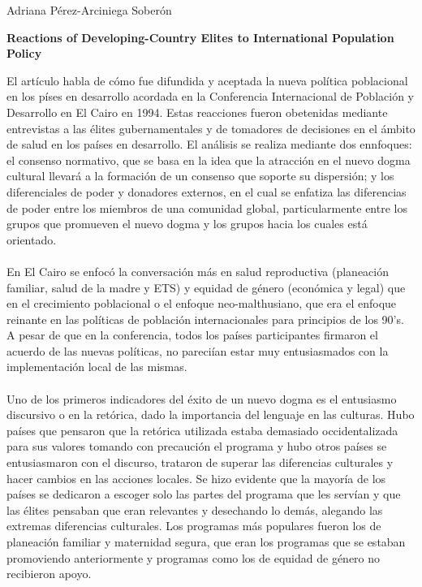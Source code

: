 \documentclass[10pt,spanish,letterpaper]{article}
\theoremstyle{plain}
\begin{document}
\begin{flushleft}
Adriana P\'erez-Arciniega Sober\'on
\end{flushleft}
\begin{center}
\textbf{Reactions of Developing-Country Elites to International Population Policy}
\end{center}
El art\'iculo \cite{luke2002reactions} habla de c\'omo fue difundida y aceptada la nueva pol\'itica poblacional en los p\'ises en desarrollo acordada en la Conferencia Internacional de Poblaci\'on y Desarrollo en El Cairo en 1994. Estas reacciones fueron obetenidas mediante entrevistas a las \'elites gubernamentales y de tomadores de decisiones en el \'ambito de salud en los pa\'ises en desarrollo. El an\'alisis se realiza mediante dos ennfoques: el consenso normativo, que se basa en la idea que la atracci\'on en el nuevo dogma cultural llevar\'a a la formaci\'on de un consenso que soporte su dispersi\'on; y los diferenciales de poder y donadores externos, en el cual se enfatiza las diferencias de poder entre los miembros de una comunidad global, particularmente entre los grupos que promueven el nuevo dogma y los grupos hacia los cuales est\'a orientado.\\
\\
En El Cairo se enfoc\'o la conversaci\'on m\'as en salud reproductiva (planeaci\'on familiar, salud de la madre y ETS) y equidad de g\'enero (econ\'omica y legal) que en el crecimiento poblacional o el enfoque neo-malthusiano, que era el enfoque reinante en las pol\'iticas de poblaci\'on internacionales para principios de los 90's. A pesar de que en la conferencia, todos los pa\'ises participantes firmaron el acuerdo de las nuevas pol\'iticas, no pareci\'ian estar muy entusiasmados con la implementaci\'on local de las mismas.\\
\\
Uno de los primeros indicadores del \'exito de un nuevo dogma es el entusiasmo discursivo o en la ret\'orica, dado la importancia del lenguaje en las culturas. Hubo pa\'ises que pensaron que la ret\'orica utilizada estaba demasiado occidentalizada para sus valores tomando con precauci\'on el programa y hubo otros pa\'ises se entusiasmaron con el discurso, trataron de superar las diferencias culturales y hacer cambios en las acciones locales. Se hizo evidente que la mayor\'ia de los pa\'ises se dedicaron a escoger solo las partes del programa que les serv\'ian y que las \'elites pensaban que eran relevantes y desechando lo dem\'as, alegando las extremas diferencias culturales. Los programas m\'as populares fueron los de planeaci\'on familiar y maternidad segura, que eran los programas que se estaban promoviendo anteriormente y programas como los de equidad de g\'enero no recibieron apoyo.\\
\end{document}

